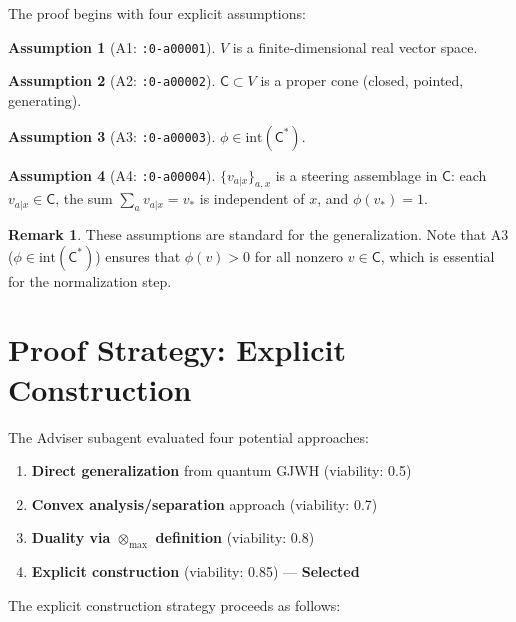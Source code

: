 \documentclass[11pt,a4paper]{article}
\theoremstyle{definition}
\newtheorem{remark}[theorem]{Remark}
\newtheorem{assumption}{Assumption}
\newcommand{\C}{\mathsf{C}}
\newcommand{\Cstar}{\mathsf{C}^*}
\newcommand{\tmax}{\otimes_{\max}}
\newcommand{\interior}{\mathrm{int}}
\begin{document}
The proof begins with four explicit assumptions:

\begin{assumption}[A1: \texttt{:0-a00001}]
$V$ is a finite-dimensional real vector space.
\end{assumption}

\begin{assumption}[A2: \texttt{:0-a00002}]
$\C \subset V$ is a proper cone (closed, pointed, generating).
\end{assumption}

\begin{assumption}[A3: \texttt{:0-a00003}]
$\phi \in \interior(\Cstar)$.
\end{assumption}

\begin{assumption}[A4: \texttt{:0-a00004}]
$\{v_{a|x}\}_{a,x}$ is a steering assemblage in $\C$: each $v_{a|x} \in \C$, the sum $\sum_a v_{a|x} = v_*$ is independent of $x$, and $\phi(v_*) = 1$.
\end{assumption}

\begin{remark}
These assumptions are standard for the generalization. Note that A3 ($\phi \in \interior(\Cstar)$) ensures that $\phi(v) > 0$ for all nonzero $v \in \C$, which is essential for the normalization step.
\end{remark}

\section{Proof Strategy: Explicit Construction}

The Adviser subagent evaluated four potential approaches:

\begin{enumerate}
    \item \textbf{Direct generalization} from quantum GJWH (viability: 0.5)
    \item \textbf{Convex analysis/separation} approach (viability: 0.7)
    \item \textbf{Duality via $\tmax$ definition} (viability: 0.8)
    \item \textbf{Explicit construction} (viability: 0.85) --- \textbf{Selected}
\end{enumerate}

The explicit construction strategy proceeds as follows:
\end{document}

